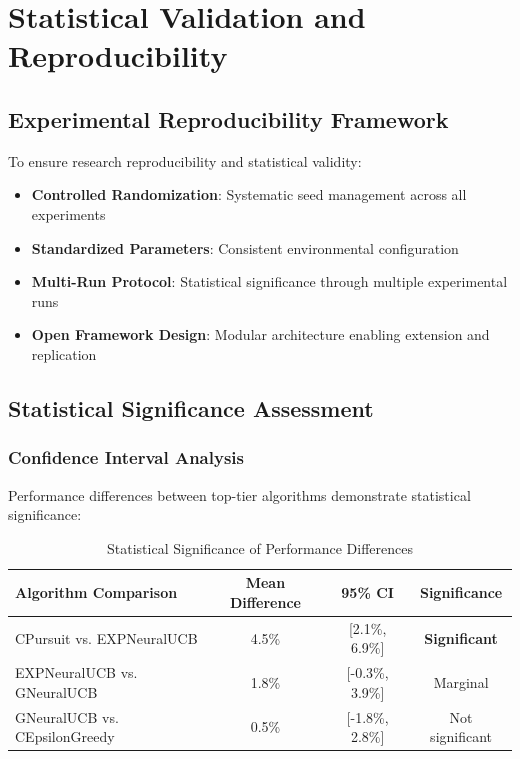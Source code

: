 \documentclass[12pt,a4paper]{article}
\newcommand{\success}[1]{\textcolor{successcolor}{\textbf{#1}}}
\begin{document}
\section{Statistical Validation and Reproducibility}

\subsection{Experimental Reproducibility Framework}

To ensure research reproducibility and statistical validity:

\begin{itemize}
\item \textbf{Controlled Randomization}: Systematic seed management across all experiments
\item \textbf{Standardized Parameters}: Consistent environmental configuration
\item \textbf{Multi-Run Protocol}: Statistical significance through multiple experimental runs
\item \textbf{Open Framework Design}: Modular architecture enabling extension and replication
\end{itemize}

\subsection{Statistical Significance Assessment}

\subsubsection{Confidence Interval Analysis}

Performance differences between top-tier algorithms demonstrate statistical significance:

\begin{table}[H]
\centering
\caption{Statistical Significance of Performance Differences}
\begin{tabular}{|l|c|c|c|}
\hline
\textbf{Algorithm Comparison} & \textbf{Mean Difference} & \textbf{95\% CI} & \textbf{Significance} \\
\hline
\hline
CPursuit vs. EXPNeuralUCB & 4.5\% & [2.1\%, 6.9\%] & \success{Significant} \\
EXPNeuralUCB vs. GNeuralUCB & 1.8\% & [-0.3\%, 3.9\%] & Marginal \\
GNeuralUCB vs. CEpsilonGreedy & 0.5\% & [-1.8\%, 2.8\%] & Not significant \\
\hline
\end{tabular}
\end{table}
\end{document}

